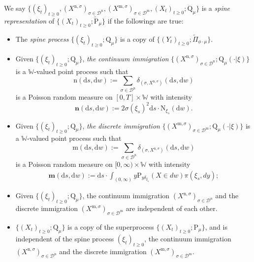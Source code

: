 \documentclass[12pt,a4paper]{amsart}
\numberwithin{equation}{section}
\theoremstyle{plain}
\theoremstyle{definition}
\theoremstyle{remark}
\begin{document}
We say $\{(\xi_t)_{t\geq 0}, (X^{\mathrm n, \sigma})_{\sigma\in \mathcal D^\mathrm n}, (X^{\mathrm m, \sigma})_{\sigma \in \mathcal D^\mathrm m}, (X_t)_{t\geq 0}; \mathrm Q_{\mu}\}$ is a \emph{spine representation} of $\{(X_t)_{t\geq 0}; \widetilde {\mathrm P}_\mu\}$ if the followings are true:
\begin{itemize}
	\item
	The \emph{spine process} $\{(\xi_t)_{t\geq 0}; \mathrm Q_\mu\}$ is a copy of $\{(Y_t)_{t\geq 0}; \widetilde \Pi_{\phi\cdot\mu}\}$.
	\item
	Given $\{(\xi_t)_{t\geq 0}; \mathrm Q_\mu\}$, \emph{the continuum immigration} $\{ (X^{\mathrm n,\sigma})_{\sigma \in \mathcal D^\mathrm n}; \mathrm Q_\mu(\cdot |\xi)\}$ is a $\mathbb W$-valued point process such that
	\[
	\mathrm n(\mathrm ds, \mathrm dw) := \sum_{\sigma\in \mathcal D^{\mathrm n}} \delta_{(\sigma, X^{\mathrm n,\sigma})}(\mathrm ds, \mathrm dw)
	\]
	is a Poisson random measure on $[0,T]\times \mathbb W$ with intensity
	\[
	\mathbf n(\mathrm ds, \mathrm dw):= 2 \sigma(\xi_s)^2 \mathrm ds \cdot \mathrm N_{\xi_s}(\mathrm dw).
	\]
	\item
	Given $\{(\xi_t)_{t\geq 0}; \mathrm Q_\mu\}$, \emph{the discrete immigration} $\{(X^{\mathrm m,\sigma})_{\sigma\in \mathcal D^{\mathrm m}}; \mathrm Q_\mu(\cdot |\xi)\}$ is a $\mathbb W$-valued point process such that
	\[
	\mathrm m(\mathrm ds, \mathrm dw) := \sum_{\sigma\in \mathcal D^{\mathrm n}} \delta_{(\sigma, X^{\mathrm n,\sigma})}(\mathrm ds, \mathrm dw)
	\]
	is a Poisson random measure on $[0,\infty ) \times \mathbb W$ with intensity
	\begin{align}
		\mathbf m(\mathrm ds, \mathrm dw):= \mathrm ds \cdot \int_{(0,\infty)} y \mathrm P_{y\delta_{\xi_s}}(X\in dw) \pi(\xi_s,dy);
	\end{align}
	\item
	Given $\{(\xi_t)_{t\geq 0}; \mathrm Q_\mu\}$, the continuum immigration $(X^{\mathrm n,\sigma})_{\sigma \in \mathcal D^n}$ and the discrete immigration $(X^{\mathrm m,\sigma})_{\sigma\in \mathcal D^{\mathrm m}}$ are independent of each other.
	\item
	$\{(X_t)_{t\geq 0}; \mathrm Q_\mu\}$ is a copy of the superprocess $\{(X_t)_{t\geq 0}; \mathrm P_\mu\}$, and is independent of the spine process $(\xi_t)_{t\geq 0}$, the continuum immigration $(X^{\mathrm n,\sigma})_{\sigma \in \mathcal D^\mathrm n}$ and the discrete immigration $(X^{\mathrm m,\sigma})_{\sigma\in \mathcal D^{\mathrm m}}$.
\end{itemize}
\end{document}

